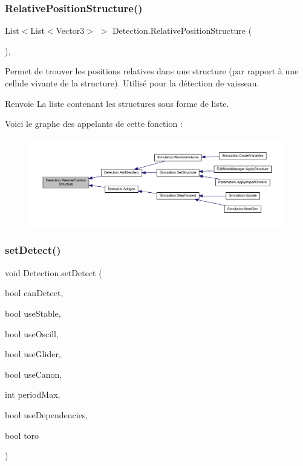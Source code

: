 \subsubsection{\texorpdfstring{Relative\+Position\+Structure()}{RelativePositionStructure()}}
{\footnotesize\ttfamily List$<$List$<$Vector3$>$ $>$ Detection.\+Relative\+Position\+Structure (\begin{DoxyParamCaption}{ }\end{DoxyParamCaption})\hspace{0.3cm}{\ttfamily [inline]}, {\ttfamily [private]}}



Permet de trouver les positions relatives dans une structure (par rapport à une cellule vivante de la structure). Utilisé pour la détection de vaisseau. 

\begin{DoxyReturn}{Renvoie}
La liste contenant les structures sous forme de liste.
\end{DoxyReturn}
Voici le graphe des appelants de cette fonction \+:
\nopagebreak
\begin{figure}[H]
\begin{center}
\leavevmode
\includegraphics[width=350pt]{class_detection_a168b07e1ffdca2d91d8c5e251a470a25_icgraph}
\end{center}
\end{figure}
\mbox{\label{class_detection_a31fe39fdfc2f5b8c9e92bcfe1c5d6cc0}} 
\subsubsection{\texorpdfstring{set\+Detect()}{setDetect()}}
{\footnotesize\ttfamily void Detection.\+set\+Detect (\begin{DoxyParamCaption}\item[{bool}]{can\+Detect,  }\item[{bool}]{use\+Stable,  }\item[{bool}]{use\+Oscill,  }\item[{bool}]{use\+Glider,  }\item[{bool}]{use\+Canon,  }\item[{int}]{period\+Max,  }\item[{bool}]{use\+Dependencies,  }\item[{bool}]{toro }\end{DoxyParamCaption})\hspace{0.3cm}{\ttfamily [inline]}}



